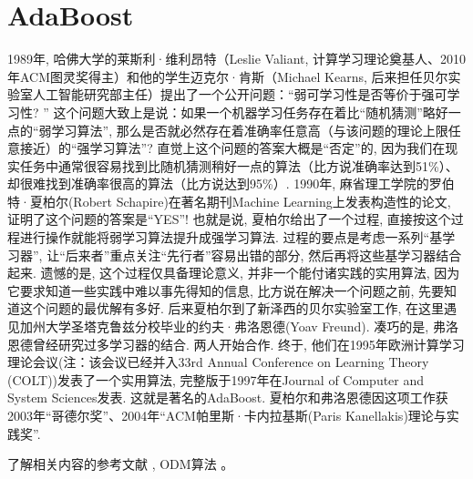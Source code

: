\section{AdaBoost}
\begin{remark}
1989年, 哈佛大学的莱斯利·维利昂特（Leslie Valiant, 计算学习理论奠基人、2010年ACM图灵奖得主）和他的学生迈克尔·肯斯（Michael Kearns, 后来担任贝尔实验室人工智能研究部主任）提出了一个公开问题：“弱可学习性是否等价于强可学习性? ”
这个问题大致上是说：如果一个机器学习任务存在着比“随机猜测”略好一点的“弱学习算法”, 那么是否就必然存在着准确率任意高（与该问题的理论上限任意接近）的“强学习算法”?
直觉上这个问题的答案大概是“否定”的, 因为我们在现实任务中通常很容易找到比随机猜测稍好一点的算法（比方说准确率达到51\%）、却很难找到准确率很高的算法（比方说达到95\%）.
1990年, 麻省理工学院的罗伯特·夏柏尔(Robert Schapire)在著名期刊Machine Learning上发表构造性的论文, 证明了这个问题的答案是“YES”!
也就是说, 夏柏尔给出了一个过程, 直接按这个过程进行操作就能将弱学习算法提升成强学习算法. 过程的要点是考虑一系列“基学习器”, 让“后来者”重点关注“先行者”容易出错的部分, 然后再将这些基学习器结合起来.
遗憾的是, 这个过程仅具备理论意义, 并非一个能付诸实践的实用算法, 因为它要求知道一些实践中难以事先得知的信息, 比方说在解决一个问题之前, 先要知道这个问题的最优解有多好.
后来夏柏尔到了新泽西的贝尔实验室工作, 在这里遇见加州大学圣塔克鲁兹分校毕业的约夫·弗洛恩德(Yoav Freund). 凑巧的是, 弗洛恩德曾经研究过多学习器的结合. 两人开始合作.
终于, 他们在1995年欧洲计算学习理论会议(注：该会议已经并入33rd Annual Conference on Learning Theory (COLT))发表了一个实用算法, 完整版于1997年在Journal of Computer and System Sciences发表. 这就是著名的AdaBoost.
夏柏尔和弗洛恩德因这项工作获2003年“哥德尔奖”、2004年“ACM帕里斯·卡内拉基斯(Paris Kanellakis)理论与实践奖”.

了解相关内容的参考文献 \cite{Zhou978-3-319-11656-3-1}, ODM算法 \cite{Zhang2020-8638559,NIPS2019-9365}。
\end{remark}

